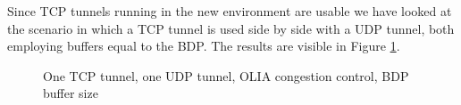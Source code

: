 Since TCP tunnels running in the new environment are usable we have looked at
the scenario in which a TCP tunnel is used side by side with a UDP tunnel,
both employing buffers equal to the BDP. The results are visible in Figure
\ref{fig:olia-mptcp-1}.

\begin{figure}[H]
  \centering

  \caption{One TCP tunnel, one UDP tunnel, OLIA congestion control, BDP
  buffer size}
  \label{fig:olia-mptcp-1}
\end{figure}

